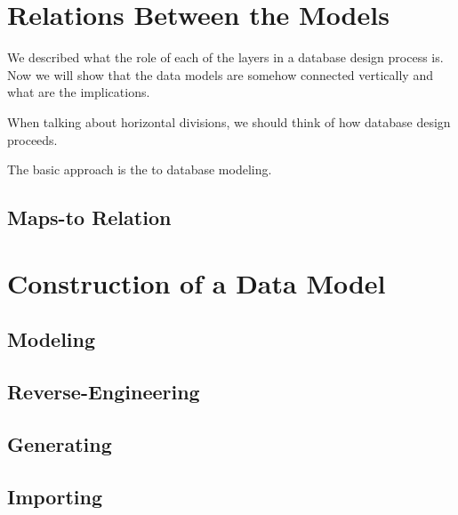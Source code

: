 
\section{Relations Between the Models}

We described what the role of each of the layers in a database design process is.
Now we will show that the data models are somehow connected vertically and what are the implications.

When talking about horizontal divisions, we should think of how database design proceeds.

The basic approach is the  to database modeling.


\subsection{Maps-to Relation}

\section{Construction of a Data Model}

\subsection{Modeling}

\subsection{Reverse-Engineering}

\subsection{Generating}

\subsection{Importing}
